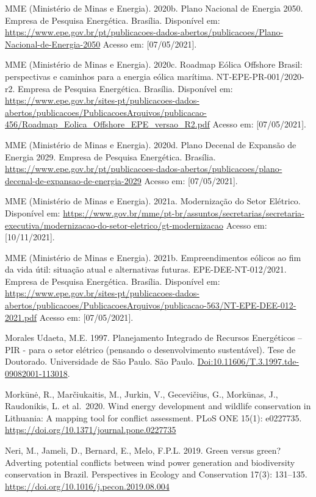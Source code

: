 \documentclass[
  oneside]{scrbook}
\begin{document}
MME (Ministério de Minas e Energia). 2020b. Plano Nacional de Energia 2050. Empresa de Pesquisa Energética. Brasília. Disponível em: \url{https://www.epe.gov.br/pt/publicacoes-dados-abertos/publicacoes/Plano-Nacional-de-Energia-2050} Acesso em: {[}07/05/2021{]}.

MME (Ministério de Minas e Energia). 2020c. Roadmap Eólica Offshore Brasil: perspectivas e caminhos para a energia eólica marítima. NT-EPE-PR-001/2020-r2. Empresa de Pesquisa Energética. Brasília. Disponível em: \url{https://www.epe.gov.br/sites-pt/publicacoes-dados-abertos/publicacoes/PublicacoesArquivos/publicacao-456/Roadmap_Eolica_Offshore_EPE_versao_R2.pdf} Acesso em: {[}07/05/2021{]}.

MME (Ministério de Minas e Energia). 2020d. Plano Decenal de Expansão de Energia 2029. Empresa de Pesquisa Energética. Brasília. \url{https://www.epe.gov.br/pt/publicacoes-dados-abertos/publicacoes/plano-decenal-de-expansao-de-energia-2029} Acesso em: {[}07/05/2021{]}.

MME (Ministério de Minas e Energia). 2021a. Modernização do Setor Elétrico. Disponível em: \url{https://www.gov.br/mme/pt-br/assuntos/secretarias/secretaria-executiva/modernizacao-do-setor-eletrico/gt-modernizacao} Acesso em: {[}10/11/2021{]}.

MME (Ministério de Minas e Energia). 2021b. Empreendimentos eólicos ao fim da vida útil: situação atual e alternativas futuras. EPE-DEE-NT-012/2021. Empresa de Pesquisa Energética. Brasília. Disponível em: \url{https://www.epe.gov.br/sites-pt/publicacoes-dados-abertos/publicacoes/PublicacoesArquivos/publicacao-563/NT-EPE-DEE-012-2021.pdf} Acesso em: {[}07/05/2021{]}.

Morales Udaeta, M.E. 1997. Planejamento Integrado de Recursos Energéticos -- PIR - para o setor elétrico (pensando o desenvolvimento sustentável). Tese de Doutorado. Universidade de São Paulo. São Paulo. \url{Doi:10.11606/T.3.1997.tde-09082001-113018}.

Morkūnė, R., Marčiukaitis, M., Jurkin, V., Gecevičius, G., Morkūnas, J., Raudonikis, L. et al.~2020. Wind energy development and wildlife conservation in Lithuania: A mapping tool for conflict assessment. PLoS ONE 15(1): e0227735. \url{https://doi.org/10.1371/journal.pone.0227735}

Neri, M., Jameli, D., Bernard, E., Melo, F.P.L. 2019. Green versus green? Adverting potential conflicts between wind power generation and biodiversity conservation in Brazil. Perspectives in Ecology and Conservation 17(3): 131--135. \url{https://doi.org/10.1016/j.pecon.2019.08.004}
\end{document}
